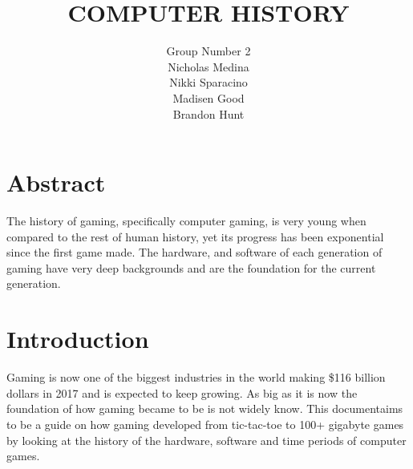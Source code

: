\documentclass[letterpaper, 10 pt, conference]{IEEEconf}
\title{\LARGE \bf
COMPUTER HISTORY\\
\large
}
\author{Group Number 2\\
\small Nicholas Medina\\
\small Nikki Sparacino\\
\small Madisen Good\\
\small Brandon Hunt\\
}
\begin{document}
\maketitle 

\section{Abstract}

The history of gaming, specifically computer gaming, is very young when compared
to the rest of human history, yet its progress has been exponential since the first
game made. The hardware, and software of each generation of gaming have very deep
backgrounds and are the foundation for the current generation.

\section{Introduction}

Gaming is now one of the biggest industries in the world making \$116 billion dollars
in 2017 and is expected to keep growing. As big as it is now the foundation of how gaming
became to be is not widely know. This documentaims to be a guide on how gaming developed from
tic-tac-toe to 100+ gigabyte games by looking at the history of the hardware, software and 
time periods of computer games.
\end{document}
